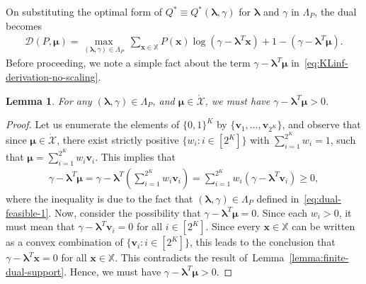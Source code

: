 \documentclass{article}
\theoremstyle{plain}
\newtheorem{lemma}[lemma]{Lemma}
\theoremstyle{definition}
\newcommand{\lrp}[1]{\left( #1 \right)}
\newcommand{\calX}{\mathcal X}
\newcommand{\vvec}{\mathbf{v}}
\newcommand{\xvec}{\mathbf{x}}
\newcommand{\boldlambda}{\boldsymbol{\lambda}}
\newcommand{\boldmu}{\boldsymbol{\mu}}
\newcommand{\finitesupport}{\mathbb{X}}
\begin{document}
On substituting the optimal form of $Q^* \equiv Q^*(\boldlambda, \gamma)$ for $\boldlambda$ and $\gamma$ in $\Lambda_P$, the dual becomes 
\begin{align}
    \mathcal D(P,\boldmu) = \max\limits_{(\boldlambda, \gamma) \in \Lambda_P} ~ \sum\limits_{\xvec \in\finitesupport} P(\xvec) \log\lrp{ \gamma - \boldlambda^T \xvec } + 1 - \lrp{ \gamma  - \boldlambda^T \boldmu}. \label{eq:KLinf-derivation-no-scaling}
\end{align}
Before proceeding, we note a simple fact about the term $\gamma - \boldlambda^T \boldmu$ in~\eqref{eq:KLinf-derivation-no-scaling}. 
\begin{lemma}
    \label{lemma:finite-positive-constant} For any $(\boldlambda, \gamma) \in \Lambda_P$, and $\boldmu \in \mathring{\calX}$, we must have $\gamma - \boldlambda^T \boldmu >0$. 
\end{lemma}
\begin{proof}
    Let us enumerate the elements of $\{0,1\}^K$ by $\{\vvec_1, \ldots, \vvec_{2^K}\}$, and observe that since $\boldmu \in \mathring{\calX}$, there exist strictly positive $\{w_i: i \in [2^K]\}$ with $\sum_{i=1}^{2^K} w_i = 1$, such that $\boldmu = \sum_{i=1}^{2^K} w_i \vvec_i$. This implies that 
    \begin{align}
        \gamma - \boldlambda^T \boldmu = \gamma - \boldlambda^T \lrp{\sum_{i=1}^{2^K}  w_i \vvec_i}  = \sum_{i=1}^{2^K} w_i \lrp{\gamma - \boldlambda^T \vvec_i} \geq 0,  
    \end{align}
    where the inequality is due to the fact that $(\boldlambda, \gamma) \in \Lambda_P$ defined in~\eqref{eq:dual-feasible-1}. Now, consider the possibility that $\gamma - \boldlambda^T \boldmu = 0$. Since each $w_i > 0$, it must mean that $\gamma - \boldlambda^T \vvec_i = 0$ for all $i \in [2^K]$. Since every $\xvec \in \finitesupport$ can be written as a convex combination of $\{\vvec_i: i \in [2^K]\}$, this leads to the conclusion that $\gamma - \boldlambda^T \xvec = 0$ for all $\xvec \in \finitesupport$. This contradicts the result of~Lemma~\ref{lemma:finite-dual-support}. Hence, we must have $\gamma - \boldlambda^T \boldmu > 0$. 
\end{proof}
\end{document}
